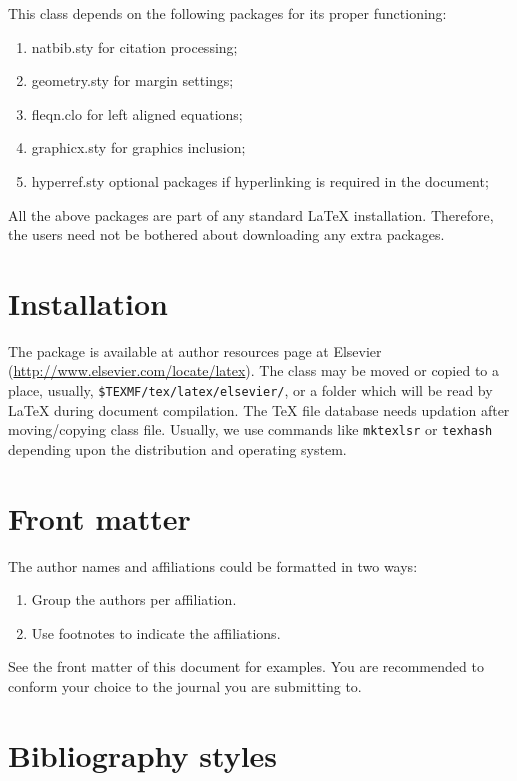 \documentclass[a4paper,fleqn]{cas-sc}
\begin{document}
This class depends on the following packages
for its proper functioning:

\begin{enumerate}
\itemsep=0pt
\item {natbib.sty} for citation processing;
\item {geometry.sty} for margin settings;
\item {fleqn.clo} for left aligned equations;
\item {graphicx.sty} for graphics inclusion;
\item {hyperref.sty} optional packages if hyperlinking is
  required in the document;
\end{enumerate}

All the above packages are part of any
standard \LaTeX{} installation.
Therefore, the users need not be
bothered about downloading any extra packages.

\section{Installation}

The package is available at author resources page at Elsevier
(\url{http://www.elsevier.com/locate/latex}).
The class may be moved or copied to a place, usually,
\verb+$TEXMF/tex/latex/elsevier/+, %
or a folder which will be read
by \LaTeX{} during document compilation.  The \TeX{} file
database needs updation after moving/copying class file.  Usually,
we use commands like \verb+mktexlsr+ or \verb+texhash+ depending
upon the distribution and operating system.

\section{Front matter}

The author names and affiliations could be formatted in two ways:
\begin{enumerate}[(1)]
\item Group the authors per affiliation.
\item Use footnotes to indicate the affiliations.
\end{enumerate}
See the front matter of this document for examples.
You are recommended to conform your choice to the journal you
are submitting to.

\section{Bibliography styles}
\end{document}
